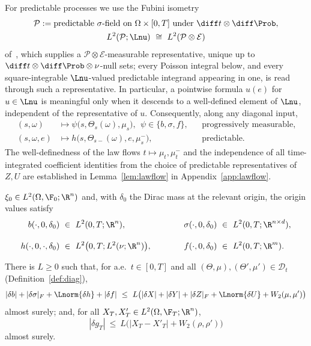 For predictable processes we use the Fubini isometry
\begin{gather}
\mathcal P:=\text{predictable $\sigma$-field on }\Omega\times[0,T]\text{ under }\diff t\otimes\diff\Prob,\notag\\
L^2(\mathcal P;\Lnu)\ \cong\ L^2(\mathcal P\otimes\mathcal E)\label{eq:fubiniiso}
\end{gather}
of~\cite[Propositions~1.2.24 and~1.2.25]{HNVW}, which supplies a
$\mathcal P\otimes\mathcal E$-measurable representative, unique up to
$\diff t\otimes\diff\Prob\otimes\nu$-null sets; every Poisson integral below, and every
square-integrable $\Lnu$-valued predictable integrand appearing in one, is read through
such a representative. In particular, a pointwise formula $u(e)$ for $u\in\Lnu$ is
meaningful only when it descends to a well-defined element of $\Lnu$, independent of
the representative of $u$. Consequently, along any diagonal input,
\begin{equation}\label{eq:coefmeas}
\begin{aligned}
(s,\omega)&\mapsto\psi\big(s,\Theta_s(\omega),\mu_s\big),\ \ \psi\in\{b,\sigma,f\},
&&\text{progressively measurable},\\[2pt]
(s,\omega,e)&\mapsto h\big(s,\Theta_{s-}(\omega),e,\mu_s^-\big),
&&\text{predictable}.
\end{aligned}
\end{equation}
The well-definedness of the law flows $t\mapsto\mu_t,\mu_t^-$ and the independence of all
time-integrated coefficient identities from the choice of predictable representatives of
$Z,U$ are established in Lemma~\ref{lem:lawflow} in Appendix~\ref{app:lawflow}.

\begin{assumption}\label{ass:integ}
$\xi_0\in L^2(\Omega,\F_0;\R^n)$ and, with $\delta_0$ the Dirac mass at the relevant origin,
the origin values satisfy
\[
\begin{aligned}
b(\cdot,0,\delta_0)\ &\in\ L^2(0,T;\R^n),
&\qquad\quad \sigma(\cdot,0,\delta_0)\ &\in\ L^2(0,T;\R^{n\times d}),\\[2.2ex]
h(\cdot,0,\cdot,\delta_0)\ &\in\ L^2\bigl(0,T;L^2(\nu;\R^n)\bigr),
&\qquad\quad f(\cdot,0,\delta_0)\ &\in\ L^2(0,T;\R^m).
\end{aligned}
\]
\end{assumption}
\begin{assumption}\label{ass:lip}
There is $L\ge0$ such that, for a.e.\ $t\in[0,T]$ and all
$(\Theta,\mu),(\Theta',\mu')\in\mathcal D_t$ (Definition~\ref{def:diag}),
\[
|\delta b|+|\delta\sigma|_F+\Lnorm{\delta h}+|\delta f|
\ \le\ L\bigl(|\delta X|+|\delta Y|+|\delta Z|_F+\Lnorm{\delta U}+W_2(\mu,\mu')\bigr)
\]
almost surely; and, for all $X_T,X'_T\in L^2(\Omega,\F_T;\R^n)$,
\begin{equation}\label{eq:lipT}
|\delta g_T|\ \le\ L\bigl(|X_T-X'_T|+W_2(\rho,\rho')\bigr)
\end{equation}
almost surely.
\end{assumption}

